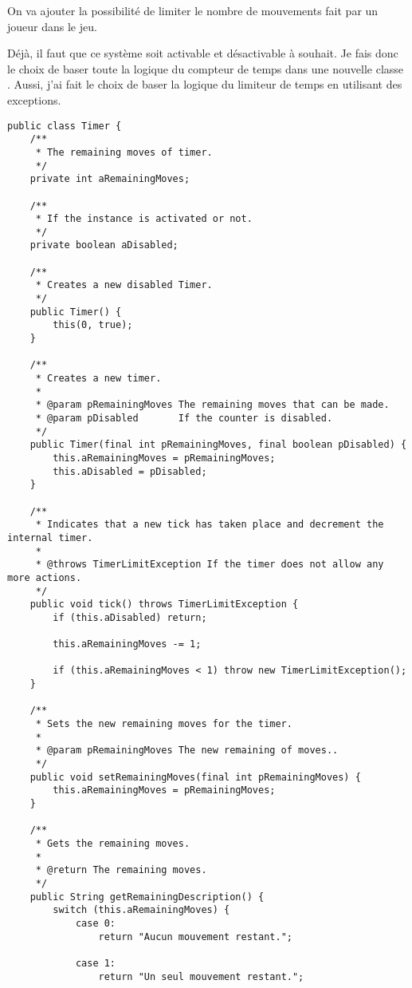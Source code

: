 \begin{exercise}[subtitle=Limite de temps]

On va ajouter la possibilité de limiter le nombre de mouvements fait par un joueur dans le jeu.

Déjà, il faut que ce système soit activable et désactivable à souhait. Je fais donc le choix de baser toute la logique du compteur de temps dans une nouvelle classe .
Aussi, j'ai fait le choix de baser la logique du limiteur de temps en utilisant des exceptions.

\begin{verbatim}
public class Timer {
    /**
     * The remaining moves of timer.
     */
    private int aRemainingMoves;

    /**
     * If the instance is activated or not.
     */
    private boolean aDisabled;

    /**
     * Creates a new disabled Timer.
     */
    public Timer() {
        this(0, true);
    }

    /**
     * Creates a new timer.
     *
     * @param pRemainingMoves The remaining moves that can be made.
     * @param pDisabled       If the counter is disabled.
     */
    public Timer(final int pRemainingMoves, final boolean pDisabled) {
        this.aRemainingMoves = pRemainingMoves;
        this.aDisabled = pDisabled;
    }

    /**
     * Indicates that a new tick has taken place and decrement the internal timer.
     *
     * @throws TimerLimitException If the timer does not allow any more actions.
     */
    public void tick() throws TimerLimitException {
        if (this.aDisabled) return;

        this.aRemainingMoves -= 1;

        if (this.aRemainingMoves < 1) throw new TimerLimitException();
    }

    /**
     * Sets the new remaining moves for the timer.
     *
     * @param pRemainingMoves The new remaining of moves..
     */
    public void setRemainingMoves(final int pRemainingMoves) {
        this.aRemainingMoves = pRemainingMoves;
    }

    /**
     * Gets the remaining moves.
     *
     * @return The remaining moves.
     */
    public String getRemainingDescription() {
        switch (this.aRemainingMoves) {
            case 0:
                return "Aucun mouvement restant.";

            case 1:
                return "Un seul mouvement restant.";


\end{verbatim}
\end{exercise}
